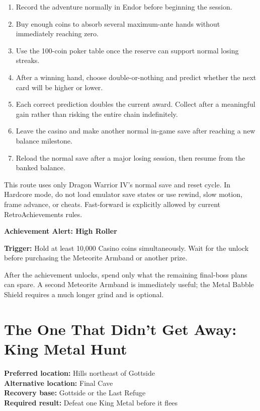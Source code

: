 \documentclass[
  american,
  10pt,
  letterpaper,
  oneside,
  open=any]{scrreprt}
\providecommand{\tightlist}{%
  \setlength{\itemsep}{0pt}\setlength{\parskip}{0pt}}
\begin{document}
\begin{enumerate}
\def\labelenumi{\arabic{enumi}.}
\tightlist
\item
  Record the adventure normally in Endor before beginning the session.
\item
  Buy enough coins to absorb several maximum-ante hands without
  immediately reaching zero.
\item
  Use the 100-coin poker table once the reserve can support normal
  losing streaks.
\item
  After a winning hand, choose double-or-nothing and predict whether the
  next card will be higher or lower.
\item
  Each correct prediction doubles the current award. Collect after a
  meaningful gain rather than risking the entire chain indefinitely.
\item
  Leave the casino and make another normal in-game save after reaching a
  new balance milestone.
\item
  Reload the normal save after a major losing session, then resume from
  the banked balance.
\end{enumerate}

This route uses only Dragon Warrior IV's normal save and reset cycle. In
Hardcore mode, do not load emulator save states or use rewind, slow
motion, frame advance, or cheats. Fast-forward is explicitly allowed by
current RetroAchievements rules.

\begin{achievementalert}

\textbf{Achievement Alert: High Roller}

\textbf{Trigger:} Hold at least 10,000 Casino coins simultaneously. Wait
for the unlock before purchasing the Meteorite Armband or another prize.

\end{achievementalert}

After the achievement unlocks, spend only what the remaining final-boss
plans can spare. A second Meteorite Armband is immediately useful; the
Metal Babble Shield requires a much longer grind and is optional.

\section{The One That Didn't Get Away: King Metal
Hunt}\label{the-one-that-didnt-get-away-king-metal-hunt}

\textbf{Preferred location:} Hills northeast of Gottside\\
\textbf{Alternative location:} Final Cave\\
\textbf{Recovery base:} Gottside or the Last Refuge\\
\textbf{Required result:} Defeat one King Metal before it flees
\end{document}
